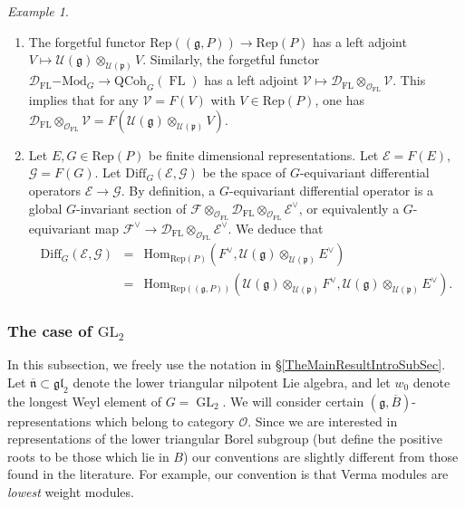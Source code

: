 \documentclass[10pt, oneside]{amsart}
\numberwithin{equation}{subsection}
\theoremstyle{definition}
\theoremstyle{remark}
\newtheorem{example}[equation]{Example}
\newcommand{\opn}[1]{\operatorname{#1}}
\begin{document}
\begin{example} \leavevmode
\begin{enumerate}
\item The forgetful functor $\mathrm{Rep}((\mathfrak{g},P))  \rightarrow \mathrm{Rep}(P)$ has a left adjoint $V \mapsto \mathcal{U}(\mathfrak{g}) \otimes_{\mathcal{U}(\mathfrak{p})} V$. Similarly, the forgetful functor $ \mathcal{D}_{\opn{FL}}\mathrm{-Mod}_G \rightarrow \mathrm{QCoh}_{G}(\opn{FL})$ has a left adjoint $\mathcal{V} \mapsto \mathcal{D}_{\opn{FL}} \otimes_{\mathcal{O}_{\opn{FL}}} \mathcal{V}$. 
This implies that for any $\mathcal{V} = F(V)$ with $V \in \mathrm{Rep}(P)$, one has $\mathcal{D}_{\opn{FL}} \otimes_{\mathcal{O}_{\opn{FL}}} \mathcal{V} = F(\mathcal{U}(\mathfrak{g}) \otimes_{\mathcal{U}(\mathfrak{p})} V)$. 
\item Let $E,G \in \mathrm{Rep}(P)$ be finite dimensional representations. Let $\mathcal{E}=F(E)$, $\mathcal{G}= F(G)$.  Let $\mathrm{Diff}_G(\mathcal{E}, \mathcal{G})$ be the space of  $G$-equivariant differential operators $\mathcal{E} \rightarrow \mathcal{G}$. By definition, a $G$-equivariant differential operator is a  global $G$-invariant section of 
$\mathcal{F} \otimes_{\mathcal{O}_{\opn{FL}}} \mathcal{D}_{\opn{FL}} \otimes_{\mathcal{O}_{\opn{FL}}} \mathcal{E}^\vee$, or equivalently a 
$G$-equivariant map 
$\mathcal{F}^\vee \rightarrow \mathcal{D}_{\opn{FL}} \otimes_{\mathcal{O}_{\opn{FL}}} \mathcal{E}^\vee $. We deduce that 
\begin{eqnarray*}
\mathrm{Diff}_G(\mathcal{E}, \mathcal{G}) &=& \mathrm{Hom}_{\mathrm{Rep}(P)}( F^\vee , \mathcal{U}(\mathfrak{g}) \otimes_{\mathcal{U}(\mathfrak{p})} E^\vee) \\
&=& \mathrm{Hom}_{\mathrm{Rep}((\mathfrak{g},P))}( \mathcal{U}(\mathfrak{g}) \otimes_{\mathcal{U}(\mathfrak{p})}F^\vee , \mathcal{U}(\mathfrak{g}) \otimes_{\mathcal{U}(\mathfrak{p})} E^\vee).
\end{eqnarray*}
\end{enumerate}

\end{example}


\subsubsection{The case of \texorpdfstring{$\mathrm{GL}_2$}{GL(2)}}

In this subsection, we freely use the notation in \S \ref{TheMainResultIntroSubSec}. Let $\overline{\mathfrak{n}} \subset \mathfrak{gl}_2$ denote the lower triangular nilpotent Lie algebra, and let $w_0$ denote the longest Weyl element of $G=\opn{GL}_2$. We will consider certain $(\mathfrak{g}, \overline{B})$-representations which belong to category $\mathcal{O}$. Since we are interested in representations of the lower triangular Borel subgroup (but define the positive roots to be those which lie in $B$) our conventions are slightly different from those found in the literature. For example, our convention is that Verma modules are \emph{lowest} weight modules. 
\end{document}
